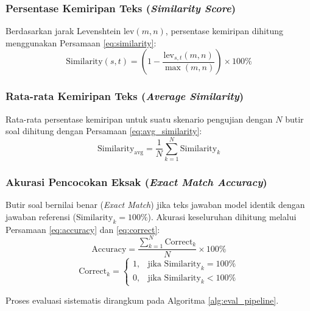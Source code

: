 \documentclass[10pt,a4paper]{article}
\begin{document}
\subsubsection{Persentase Kemiripan Teks (\textit{Similarity Score})}
Berdasarkan jarak Levenshtein $\text{lev}(m, n)$, persentase kemiripan dihitung menggunakan Persamaan \eqref{eq:similarity}:
\begin{equation}
\text{Similarity}(s, t) = \left( 1 - \frac{\text{lev}_{s,t}(m, n)}{\max(m, n)} \right) \times 100\%
\label{eq:similarity}
\end{equation}

\subsubsection{Rata-rata Kemiripan Teks (\textit{Average Similarity})}
Rata-rata persentase kemiripan untuk suatu skenario pengujian dengan $N$ butir soal dihitung dengan Persamaan \eqref{eq:avg_similarity}:
\begin{equation}
\text{Similarity}_{\text{avg}} = \frac{1}{N} \sum_{k=1}^{N} \text{Similarity}_k
\label{eq:avg_similarity}
\end{equation}

\subsubsection{Akurasi Pencocokan Eksak (\textit{Exact Match Accuracy})}
Butir soal bernilai benar (\textit{Exact Match}) jika teks jawaban model identik dengan jawaban referensi ($\text{Similarity}_k = 100\%$). Akurasi keseluruhan dihitung melalui Persamaan \eqref{eq:accuracy} dan \eqref{eq:correct}:
\begin{equation}
\text{Accuracy} = \frac{\sum_{k=1}^{N} \text{Correct}_k}{N} \times 100\%
\label{eq:accuracy}
\end{equation}
\begin{equation}
\text{Correct}_k = \begin{cases} 
1, & \text{jika } \text{Similarity}_k = 100\% \\ 
0, & \text{jika } \text{Similarity}_k < 100\% 
\end{cases}
\label{eq:correct}
\end{equation}

Proses evaluasi sistematis dirangkum pada Algoritma \ref{alg:eval_pipeline}.
\end{document}
